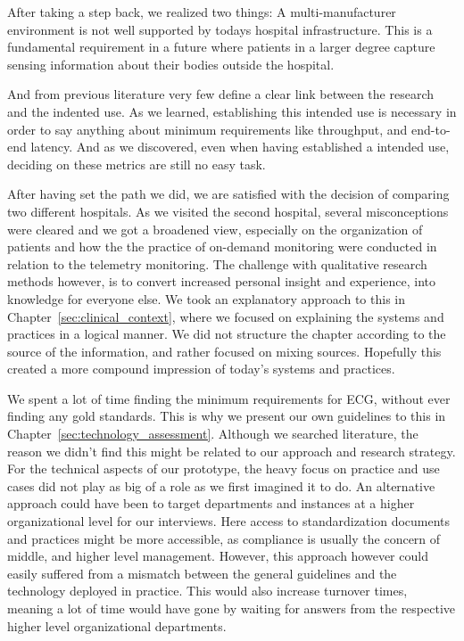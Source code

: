 After taking a step back, we realized two things: A multi-manufacturer environment is not well supported by todays hospital infrastructure. This is a fundamental requirement in a future where patients in a larger degree capture sensing information about their bodies outside the hospital. 

And from previous literature very few define a clear link between the research and the indented use. As we learned, establishing this intended use is necessary in order to say anything about minimum requirements like throughput, and end-to-end latency. And as we discovered, even when having established a intended use, deciding on these metrics are still no easy task.

After having set the path we did, we are satisfied with the decision of comparing two different hospitals. As we visited the second hospital, several misconceptions were cleared and we got a broadened view, especially on the organization of patients and how the the practice of on-demand monitoring were conducted in relation to the telemetry monitoring. The challenge with qualitative research methods however, is to convert increased personal insight and experience, into knowledge for everyone else. We took an explanatory approach to this in Chapter~\ref{sec:clinical_context}, where we focused on explaining the systems and practices in a logical manner. We did not structure the chapter according to the source of the information, and rather focused on mixing sources. Hopefully this created a more compound impression of today's systems and practices.

We spent a lot of time finding the minimum requirements for ECG, without ever finding any gold standards. This is why we present our own guidelines to this in Chapter~\ref{sec:technology_assessment}. Although we searched literature, the reason we didn't find this might be related to our approach and research strategy. For the technical aspects of our prototype, the heavy focus on practice and use cases did not play as big of a role as we first imagined it to do. An alternative approach could have been to target departments and instances at a higher organizational level for our interviews. Here access to standardization documents and practices might be more accessible, as compliance is usually the concern of middle, and higher level management. However, this approach however could easily suffered from a mismatch between the general guidelines and the technology deployed in practice. This would also increase turnover times, meaning a lot of time would have gone by waiting for answers from the respective higher level organizational departments.

